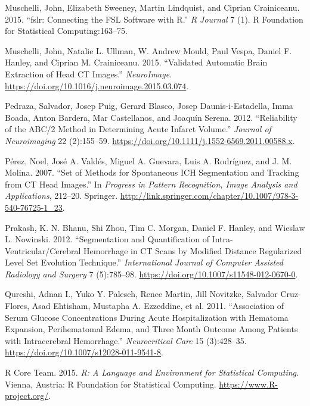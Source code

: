 \documentclass[]{elsarticle} %
\begin{document}
\leavevmode\hypertarget{ref-muschelli2015fslr}{}%
Muschelli, John, Elizabeth Sweeney, Martin Lindquist, and Ciprian
Crainiceanu. 2015. ``fslr: Connecting the FSL Software with R.'' \emph{R
Journal} 7 (1). R Foundation for Statistical Computing:163--75.

\leavevmode\hypertarget{ref-muschelli_validated_2015}{}%
Muschelli, John, Natalie L. Ullman, W. Andrew Mould, Paul Vespa, Daniel
F. Hanley, and Ciprian M. Crainiceanu. 2015. ``Validated Automatic Brain
Extraction of Head CT Images.'' \emph{NeuroImage}.
\url{https://doi.org/10.1016/j.neuroimage.2015.03.074}.

\leavevmode\hypertarget{ref-pedraza_reliability_2012}{}%
Pedraza, Salvador, Josep Puig, Gerard Blasco, Josep Daunis-i-Estadella,
Imma Boada, Anton Bardera, Mar Castellanos, and Joaquín Serena. 2012.
``Reliability of the ABC/2 Method in Determining Acute Infarct Volume.''
\emph{Journal of Neuroimaging} 22 (2):155--59.
\url{https://doi.org/10.1111/j.1552-6569.2011.00588.x}.

\leavevmode\hypertarget{ref-perez_set_2007}{}%
Pérez, Noel, José A. Valdés, Miguel A. Guevara, Luis A. Rodríguez, and
J. M. Molina. 2007. ``Set of Methods for Spontaneous ICH Segmentation
and Tracking from CT Head Images.'' In \emph{Progress in Pattern
Recognition, Image Analysis and Applications}, 212--20. Springer.
\url{http://link.springer.com/chapter/10.1007/978-3-540-76725-1_23}.

\leavevmode\hypertarget{ref-prakash_segmentation_2012}{}%
Prakash, K. N. Bhanu, Shi Zhou, Tim C. Morgan, Daniel F. Hanley, and
Wieslaw L. Nowinski. 2012. ``Segmentation and Quantification of
Intra-Ventricular/Cerebral Hemorrhage in CT Scans by Modified Distance
Regularized Level Set Evolution Technique.'' \emph{International Journal
of Computer Assisted Radiology and Surgery} 7 (5):785--98.
\url{https://doi.org/10.1007/s11548-012-0670-0}.

\leavevmode\hypertarget{ref-qureshi_association_2011}{}%
Qureshi, Adnan I., Yuko Y. Palesch, Renee Martin, Jill Novitzke,
Salvador Cruz-Flores, Asad Ehtisham, Mustapha A. Ezzeddine, et al. 2011.
``Association of Serum Glucose Concentrations During Acute
Hospitalization with Hematoma Expansion, Perihematomal Edema, and Three
Month Outcome Among Patients with Intracerebral Hemorrhage.''
\emph{Neurocritical Care} 15 (3):428--35.
\url{https://doi.org/10.1007/s12028-011-9541-8}.

\leavevmode\hypertarget{ref-RCORE}{}%
R Core Team. 2015. \emph{R: A Language and Environment for Statistical
Computing}. Vienna, Austria: R Foundation for Statistical Computing.
\url{https://www.R-project.org/}.
\end{document}
